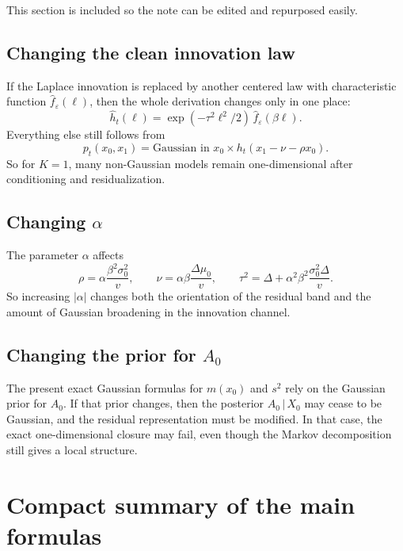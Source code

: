 \documentclass[11pt]{article}
\newcommand{\1}{\mathbf{1}}
\newcommand{\pt}{p_t}
\newcommand{\given}{\,|\,}
\theoremstyle{definition}
\begin{document}
This section is included so the note can be edited and repurposed easily.

\subsection{Changing the clean innovation law}

If the Laplace innovation is replaced by another centered law with characteristic function \(\widehat f_\varepsilon(\ell)\), then the whole derivation changes only in one place:
\begin{equation}
\widehat h_t(\ell)=\exp(-\tau^2\ell^2/2)\, \widehat f_\varepsilon(\beta \ell).
\end{equation}
Everything else still follows from
\begin{equation}
\pt(x_0,x_1)=\text{Gaussian in }x_0\times h_t(x_1-\nu-\rho x_0).
\end{equation}
So for \(K=1\), many non-Gaussian models remain one-dimensional after conditioning and residualization.

\subsection{Changing \(\alpha\)}

The parameter \(\alpha\) affects
\begin{equation}
\rho=\alpha\frac{\beta^2\sigma_0^2}{v},
\qquad
\nu=\alpha\beta\frac{\Delta\mu_0}{v},
\qquad
\tau^2=\Delta+\alpha^2\beta^2\frac{\sigma_0^2\Delta}{v}.
\end{equation}
So increasing \(|\alpha|\) changes both the orientation of the residual band and the amount of Gaussian broadening in the innovation channel.

\subsection{Changing the prior for \(A_0\)}

The present exact Gaussian formulas for \(m(x_0)\) and \(s^2\) rely on the Gaussian prior for \(A_0\). If that prior changes, then the posterior \(A_0\given X_0\) may cease to be Gaussian, and the residual representation must be modified. In that case, the exact one-dimensional closure may fail, even though the Markov decomposition still gives a local structure.

\section{Compact summary of the main formulas}
\end{document}

